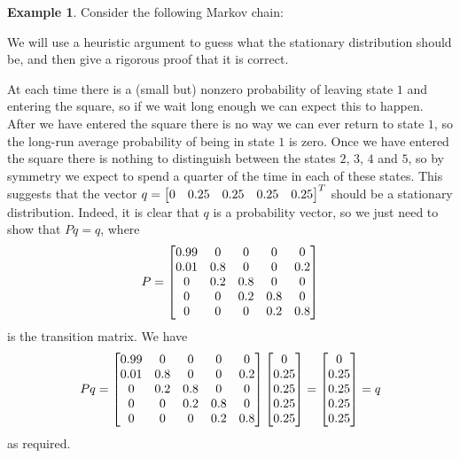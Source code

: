 \documentclass[reqno]{amsart}
\theoremstyle{definition}
\newtheorem{example}[theorem]{Example}
\begin{document}
\begin{example}\label{eg-markov-iv}
 Consider the following Markov chain:
 \begin{center}
 \end{center}
 We will use a heuristic argument to guess what the stationary
 distribution should be, and then give a rigorous proof that it is
 correct.

 At each time there is a (small but) nonzero probability of leaving
 state $1$ and entering the square, so if we wait long enough we can
 expect this to happen.  After we have entered the square there is no
 way we can ever return to state $1$, so the long-run average
 probability of being in state $1$ is zero.  Once we have entered the
 square there is nothing to distinguish between the states $2$, $3$,
 $4$ and $5$, so by symmetry we expect to spend a quarter of the time
 in each of these states.  This suggests that the vector
 $q=\left[\begin{matrix} 0&0.25&0.25&0.25&0.25\end{matrix}\right]^T$ should be a stationary
 distribution.  Indeed, it is clear that $q$ is a probability vector,
 so we just need to show that $Pq=q$, where
 \[ P = \left[\begin{matrix}
     0.99 & 0   & 0   & 0   & 0   \\
     0.01 & 0.8 & 0   & 0   & 0.2 \\
     0    & 0.2 & 0.8 & 0   & 0   \\
     0    & 0   & 0.2 & 0.8 & 0   \\
     0    & 0   & 0   & 0.2 & 0.8
    \end{matrix}\right]
 \]
 is the transition matrix.  We have
 \[ Pq =
    \left[\begin{matrix}
     0.99 & 0   & 0   & 0   & 0   \\
     0.01 & 0.8 & 0   & 0   & 0.2 \\
     0    & 0.2 & 0.8 & 0   & 0   \\
     0    & 0   & 0.2 & 0.8 & 0   \\
     0    & 0   & 0   & 0.2 & 0.8
    \end{matrix}\right]
    \left[\begin{matrix} 0 \\ 0.25 \\ 0.25 \\ 0.25 \\ 0.25 \end{matrix}\right]
    =
    \left[\begin{matrix} 0 \\ 0.25 \\ 0.25 \\ 0.25 \\ 0.25 \end{matrix}\right]
    = q
 \]
 as required.
\end{example}
\end{document}
